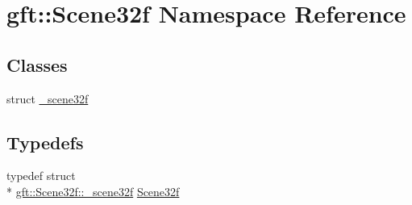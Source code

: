 \hypertarget{namespacegft_1_1Scene32f}{\section{gft\-:\-:Scene32f Namespace Reference}
\label{namespacegft_1_1Scene32f}
}
\subsection*{Classes}
\begin{DoxyCompactItemize}
\item 
struct \hyperlink{structgft_1_1Scene32f_1_1__scene32f}{\-\_\-scene32f}
\end{DoxyCompactItemize}
\subsection*{Typedefs}
\begin{DoxyCompactItemize}
\item 
typedef struct \\*
\hyperlink{structgft_1_1Scene32f_1_1__scene32f}{gft\-::\-Scene32f\-::\-\_\-scene32f} \hyperlink{namespacegft_1_1Scene32f_af233a2e92a79c7b46da9b3f38677644a}{Scene32f}
\end{DoxyCompactItemize}
